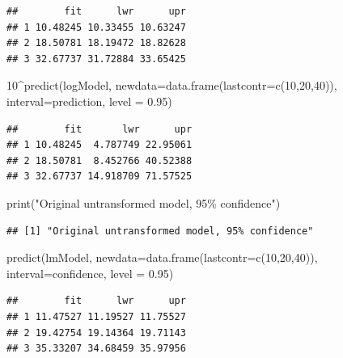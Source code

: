 \documentclass[
]{article}
\newenvironment{Shaded}{\begin{snugshade}}{\end{snugshade}}
\newcommand{\AttributeTok}[1]{\textcolor[rgb]{0.77,0.63,0.00}{#1}}
\newcommand{\DecValTok}[1]{\textcolor[rgb]{0.00,0.00,0.81}{#1}}
\newcommand{\FloatTok}[1]{\textcolor[rgb]{0.00,0.00,0.81}{#1}}
\newcommand{\FunctionTok}[1]{\textcolor[rgb]{0.00,0.00,0.00}{#1}}
\newcommand{\NormalTok}[1]{#1}
\newcommand{\SpecialCharTok}[1]{\textcolor[rgb]{0.00,0.00,0.00}{#1}}
\newcommand{\StringTok}[1]{\textcolor[rgb]{0.31,0.60,0.02}{#1}}
\begin{document}
\begin{verbatim}
##        fit      lwr      upr
## 1 10.48245 10.33455 10.63247
## 2 18.50781 18.19472 18.82628
## 3 32.67737 31.72884 33.65425
\end{verbatim}

\begin{Shaded}
\begin{Highlighting}[]
\DecValTok{10}\SpecialCharTok{\^{}}\FunctionTok{predict}\NormalTok{(logModel,}
        \AttributeTok{newdata=}\FunctionTok{data.frame}\NormalTok{(}\AttributeTok{lastcontr=}\FunctionTok{c}\NormalTok{(}\DecValTok{10}\NormalTok{,}\DecValTok{20}\NormalTok{,}\DecValTok{40}\NormalTok{)),}
        \AttributeTok{interval=}\StringTok{\textquotesingle{}prediction\textquotesingle{}}\NormalTok{,}
        \AttributeTok{level =} \FloatTok{0.95}\NormalTok{)}
\end{Highlighting}
\end{Shaded}

\begin{verbatim}
##        fit       lwr      upr
## 1 10.48245  4.787749 22.95061
## 2 18.50781  8.452766 40.52388
## 3 32.67737 14.918709 71.57525
\end{verbatim}

\begin{Shaded}
\begin{Highlighting}[]
\FunctionTok{print}\NormalTok{(}\StringTok{"Original untransformed model, 95\% confidence"}\NormalTok{)}
\end{Highlighting}
\end{Shaded}

\begin{verbatim}
## [1] "Original untransformed model, 95% confidence"
\end{verbatim}

\begin{Shaded}
\begin{Highlighting}[]
\FunctionTok{predict}\NormalTok{(lmModel,}
        \AttributeTok{newdata=}\FunctionTok{data.frame}\NormalTok{(}\AttributeTok{lastcontr=}\FunctionTok{c}\NormalTok{(}\DecValTok{10}\NormalTok{,}\DecValTok{20}\NormalTok{,}\DecValTok{40}\NormalTok{)),}
        \AttributeTok{interval=}\StringTok{\textquotesingle{}confidence\textquotesingle{}}\NormalTok{,}
        \AttributeTok{level =} \FloatTok{0.95}\NormalTok{)}
\end{Highlighting}
\end{Shaded}

\begin{verbatim}
##        fit      lwr      upr
## 1 11.47527 11.19527 11.75527
## 2 19.42754 19.14364 19.71143
## 3 35.33207 34.68459 35.97956
\end{verbatim}
\end{document}
